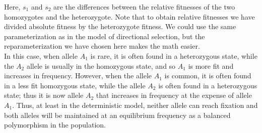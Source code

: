 Here, $s_1$ and $s_2$ are the differences between the relative fitnesses
of the two homozygotes and the heterozygote. Note that to obtain
relative fitnesses we have divided
absolute fitness by the heterozygote fitness. We could use the
same parameterization as in the model of directional selection, but
the reparameterization we have chosen here makes the math easier.\\


In this case, when allele $A_1$ is rare, it is often found in a
heterozygous state, while the $A_2$ allele is usually in the
homozygous state, and so $A_1$ is more fit and increases in frequency. However, when
the allele $A_1$ is common, it is often found in a less fit homozygous state, while
the allele $A_2$ is often found in a heterozygous state; thus it is
now allele $A_2$ that increases in frequency at the expense of allele
$A_1$. Thus, at least in the deterministic model, neither allele can
reach fixation and both alleles will be maintained at an equilibrium frequency as a balanced
polymorphism in the population. 


